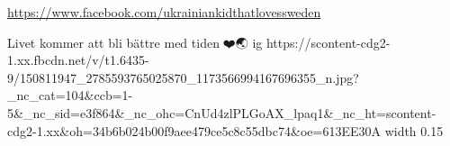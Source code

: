  
 
 
 
 

\url{https://www.facebook.com/ukrainiankidthatlovessweden}\par
Livet kommer att bli bättre med tiden🙏❤️🌏
\ifcmt
  ig https://scontent-cdg2-1.xx.fbcdn.net/v/t1.6435-9/150811947_2785593765025870_1173566994167696355_n.jpg?_nc_cat=104&ccb=1-5&_nc_sid=e3f864&_nc_ohc=CnUd4zlPLGoAX_lpaq1&_nc_ht=scontent-cdg2-1.xx&oh=34b6b024b00f9aee479ce5c8c55dbc74&oe=613EE30A
  width 0.15
\fi
